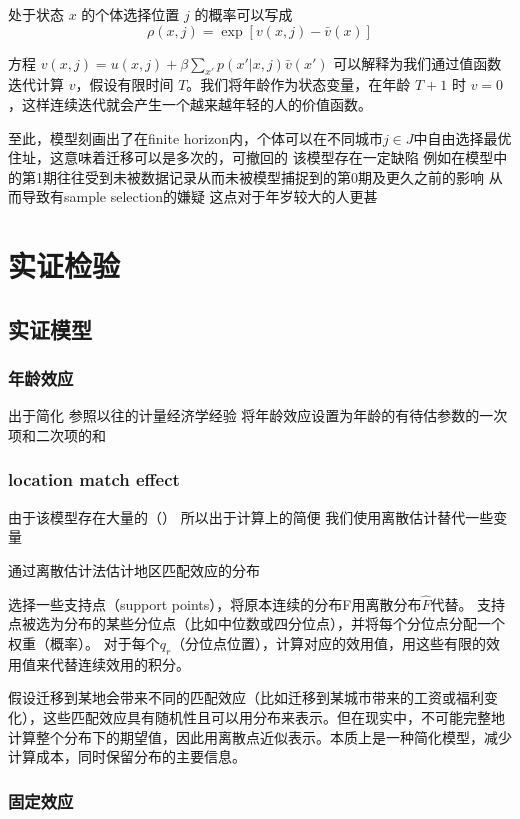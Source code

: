 \documentclass[a4paper,10pt]{article}
\begin{document}
处于状态 $x$ 的个体选择位置 $j$ 的概率可以写成
$$\rho(x,j)=\exp[v(x,j)-\bar v(x)]$$

方程 $v(x, j) = u(x, j) + \beta \sum_{x'} p(x' | x, j) \bar{v}(x')$ 可以解释为我们通过值函数迭代计算 $v$，假设有限时间 $T$。我们将年龄作为状态变量，在年龄 $T+1$ 时 $v=0$，这样连续迭代就会产生一个越来越年轻的人的价值函数。


至此，模型刻画出了在finite horizon内，个体可以在不同城市$j\in J$中自由选择最优住址，这意味着迁移可以是多次的，可撤回的
该模型存在一定缺陷
例如在模型中的第1期往往受到未被数据记录从而未被模型捕捉到的第0期及更久之前的影响
从而导致有sample selection的嫌疑
这点对于年岁较大的人更甚


\section{实证检验}

\subsection{实证模型} %
\label{sub:实证模型}
\subsubsection{年龄效应}
出于简化
参照以往的计量经济学经验
将年龄效应设置为年龄的有待估参数的一次项和二次项的和

\subsubsection{location match effect}
由于该模型存在大量的（）
所以出于计算上的简便
我们使用离散估计替代一些变量

通过离散估计法估计地区匹配效应的分布

选择一些支持点（support points），将原本连续的分布F用离散分布$\hat F$代替。
支持点被选为分布的某些分位点（比如中位数或四分位点），并将每个分位点分配一个权重（概率）。
对于每个$q_r$（分位点位置），计算对应的效用值，用这些有限的效用值来代替连续效用的积分。

假设迁移到某地会带来不同的匹配效应（比如迁移到某城市带来的工资或福利变化），这些匹配效应具有随机性且可以用分布来表示。但在现实中，不可能完整地计算整个分布下的期望值，因此用离散点近似表示。本质上是一种简化模型，减少计算成本，同时保留分布的主要信息。

\subsubsection{固定效应}
\end{document}
